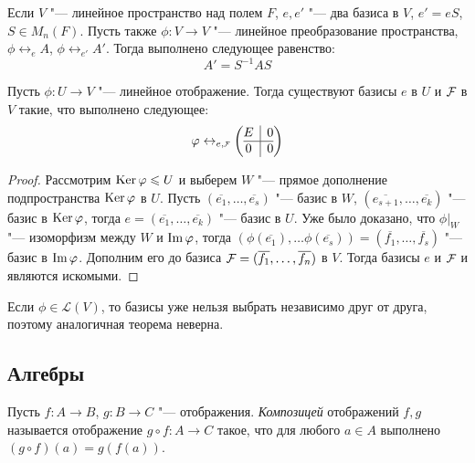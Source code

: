 \begin{corollary}
	Если $V$ "--- линейное пространство над полем $F$, $e, e'$ "--- два базиса в $V$, $e' = eS$, $S \in M_n(F)$. Пусть также $\phi : V \to V$ "--- линейное преобразование пространства, $\phi \leftrightarrow_{e} A$, $\phi \leftrightarrow_{e'} A'$. Тогда выполнено следующее равенство: \[A' = S^{-1}AS\]
\end{corollary}

\begin{theorem}
	Пусть $\phi: U \rightarrow V$ "--- линейное отображение. Тогда существуют базисы $e$ в $U$ и $\FF $ в $V$ такие, что выполнено следующее:
	\[\phi \leftrightarrow_{e, \FFF} \left(\begin{array}{@{}c|c@{}}
	E & 0\\
	\hline
	0 & 0
	\end{array}\right)\]
\end{theorem}

\begin{proof}
	Рассмотрим $\operatorname{Ker}{\varphi} \leqslant U$ и выберем $W$ "--- прямое дополнение подпространства $\operatorname{Ker}{\varphi}$ в $U$. Пусть $(\overline{e_1}, \dots, \overline{e_s})$ "--- базис в $W$, $(\overline{e_{s+1}}, \dots, \overline{e_k})$ "--- базис в $\operatorname{Ker}{\varphi}$, тогда $e = (\overline{e_1}, \dots, \overline{e_k})$ "--- базис в $U$. Уже было доказано, что $\phi|_W$ "--- изоморфизм между $W$ и $\operatorname{Im}{\varphi}$, тогда $(\phi(\overline{e_1}), \dots \phi(\overline{e_s})) = (\overline{f_1}, \dots, \overline{f_s})$ "--- базис в $\operatorname{Im}{\varphi}$. Дополним его до базиса $\FF  = (\overline{f_1}, \dots, \overline{f_n})$ в $V$. Тогда базисы $e$ и $\FF $ и являются искомыми.
\end{proof}

\begin{note}
	Если $\phi \in \mathcal{L}(V)$, то базисы уже нельзя выбрать независимо друг от друга, поэтому аналогичная теорема неверна.
\end{note}

\subsection{Алгебры}

\begin{definition}
	Пусть $f: A \rightarrow B$, $g: B\rightarrow C$ "--- отображения. \textit{Композицей} отображений $f, g$ называется отображение $g \circ f: A \rightarrow C$ такое, что для любого $a \in A$ выполнено $(g \circ f)(a) = g(f(a))$.
\end{definition}

